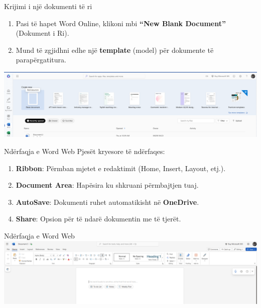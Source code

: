 \documentclass[
  ignorenonframetext,
]{beamer}
\begin{document}
\begin{frame}{Krijimi i një dokumenti të ri}
\label{krijimi-i-njuxeb-dokumenti-tuxeb-ri}
\begin{enumerate}
\item
  Pasi të hapet Word Online, klikoni mbi \textbf{``New Blank Document''}
  (Dokument i Ri).
\item
  Mund të zgjidhni edhe një \textbf{template} (model) për dokumente të
  parapërgatitura.
\end{enumerate}

\includegraphics{./images/word2.png}
\end{frame}

\begin{frame}{Ndërfaqja e Word Web}
\label{nduxebrfaqja-e-word-web}
Pjesët kryesore të ndërfaqes:

\begin{enumerate}
\item
  \textbf{Ribbon}: Përmban mjetet e redaktimit (Home, Insert, Layout,
  etj.).
\item
  \textbf{Document Area}: Hapësira ku shkruani përmbajtjen tuaj.
\item
  \textbf{AutoSave}: Dokumenti ruhet automatikisht në \textbf{OneDrive}.
\item
  \textbf{Share}: Opsion për të ndarë dokumentin me të tjerët.
\end{enumerate}
\end{frame}

\begin{frame}{Ndërfaqja e Word Web}
\label{nduxebrfaqja-e-word-web-1}
\includegraphics{./images/word3.png}
\end{frame}
\end{document}
